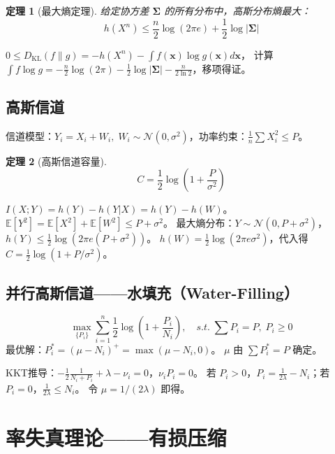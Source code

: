 \documentclass[12pt,a4paper]{ctexart}
\newtheorem{theorem}{定理}[section]
\theoremstyle{definition}
\newcommand{\EE}{\mathbb{E}}
\newcommand{\DKL}{D_{\mathrm{KL}}}
\begin{document}
\begin{theorem}[最大熵定理]
给定协方差 $\bm{\Sigma}$ 的所有分布中，高斯分布熵最大：
\[
h(X^n) \leq \frac{n}{2}\log(2\pi e) + \frac{1}{2}\log|\bm{\Sigma}|
\]
\end{theorem}

\begin{proofbox}
$0 \leq \DKL(f\|g) = -h(X^n) - \int f(\bm{x})\log g(\bm{x}) d\bm{x}$，
计算 $\int f \log g = -\frac{n}{2}\log(2\pi) - \frac{1}{2}\log|\bm{\Sigma}| - \frac{n}{2\ln 2}$，移项得证。
\end{proofbox}

\subsection{高斯信道}

信道模型：$Y_i = X_i + W_i,\; W_i \sim \mathcal{N}(0,\sigma^2)$，功率约束：$\frac{1}{n}\sum X_i^2 \leq P$。

\begin{theorem}[高斯信道容量]
\[
C = \frac{1}{2}\log\left(1 + \frac{P}{\sigma^2}\right)
\]
\end{theorem}

\begin{proofbox}
$I(X;Y) = h(Y) - h(Y|X) = h(Y) - h(W)$。
$\EE[Y^2] = \EE[X^2] + \EE[W^2] \leq P + \sigma^2$。
最大熵分布：$Y \sim \mathcal{N}(0, P+\sigma^2)$，$h(Y) \leq \frac{1}{2}\log(2\pi e(P+\sigma^2))$。
$h(W) = \frac{1}{2}\log(2\pi e\sigma^2)$，代入得 $C = \frac{1}{2}\log(1+P/\sigma^2)$。
\end{proofbox}

\subsection{并行高斯信道——水填充（Water-Filling）}

\begin{keybox}[水填充算法]
\[
\max_{\{P_i\}} \sum_{i=1}^{n} \frac{1}{2}\log\left(1+\frac{P_i}{N_i}\right), \quad s.t.\; \sum P_i = P,\; P_i \geq 0
\]
最优解：$P_i^* = (\mu - N_i)^+ = \max(\mu - N_i, 0)$。
$\mu$ 由 $\sum P_i^* = P$ 确定。
\end{keybox}

KKT推导：$-\frac{1}{2}\frac{1}{N_i+P_i} + \lambda - \nu_i = 0$，$\nu_i P_i = 0$。
若 $P_i > 0$，$P_i = \frac{1}{2\lambda} - N_i$；若 $P_i = 0$，$\frac{1}{2\lambda} \leq N_i$。
令 $\mu = 1/(2\lambda)$ 即得。

\section{率失真理论——有损压缩}
\end{document}
